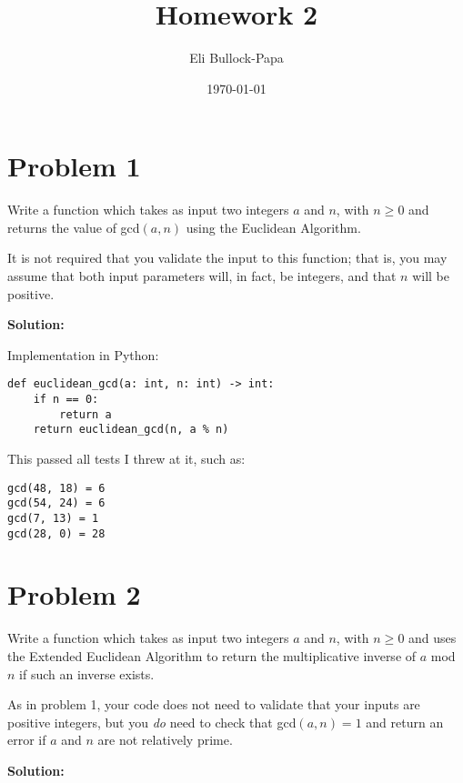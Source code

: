 \documentclass[12pt]{article}
\title{Homework 2}
\author{Eli Bullock-Papa}
\date{\today}
\begin{document}
\maketitle

\section*{Problem 1}
Write a function which takes as input two integers $a$ and $n$, with $n \geq 0$ and returns the value of gcd$(a,n)$ using the Euclidean Algorithm.

It is not required that you validate the input to this function; that is, you may assume that both input parameters will, in fact, be integers, and that $n$ will be positive.

\vspace{1em}
\textbf{Solution:}

Implementation in Python:

\begin{lstlisting}[style=python]
def euclidean_gcd(a: int, n: int) -> int:
    if n == 0:
        return a
    return euclidean_gcd(n, a % n)
\end{lstlisting}

This passed all tests I threw at it, such as:
\begin{verbatim}
gcd(48, 18) = 6
gcd(54, 24) = 6
gcd(7, 13) = 1
gcd(28, 0) = 28
\end{verbatim}

\newpage
\section*{Problem 2}
Write a function which takes as input two integers $a$ and $n$, with $n \geq 0$ and uses the Extended Euclidean Algorithm to return the multiplicative inverse of $a$ mod $n$ if such an inverse exists.

As in problem 1, your code does not need to validate that your inputs are positive integers, but you \textit{do} need to check that gcd$(a,n) = 1$ and return an error if $a$ and $n$ are not relatively prime.

\vspace{1em}
\textbf{Solution:}
\end{document}
